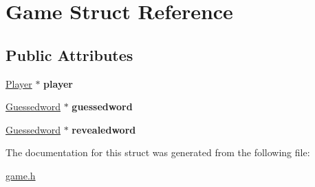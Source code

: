 \hypertarget{structGame}{\section{Game Struct Reference}
\label{structGame}
}
\subsection*{Public Attributes}
\begin{DoxyCompactItemize}
\item 
\hypertarget{structGame_abec70aa1c0269a9a7e171af4d79e08bf}{\hyperlink{structPlayer}{Player} $\ast$ {\bfseries player}}\label{structGame_abec70aa1c0269a9a7e171af4d79e08bf}

\item 
\hypertarget{structGame_a9e09b8f35b663ae068090104e9561c68}{\hyperlink{structGuessedword}{Guessedword} $\ast$ {\bfseries guessedword}}\label{structGame_a9e09b8f35b663ae068090104e9561c68}

\item 
\hypertarget{structGame_a1f5ddb27c0d8ad840994771c4b0365c6}{\hyperlink{structGuessedword}{Guessedword} $\ast$ {\bfseries revealedword}}\label{structGame_a1f5ddb27c0d8ad840994771c4b0365c6}

\end{DoxyCompactItemize}


The documentation for this struct was generated from the following file\-:\begin{DoxyCompactItemize}
\item 
\hyperlink{game_8h}{game.\-h}\end{DoxyCompactItemize}
